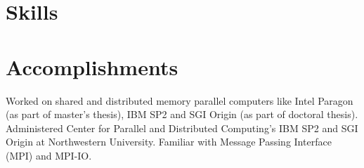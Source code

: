 \documentclass[10pt,a4paper,sans]{moderncv}
\begin{document}
\makecvtitle
\section{Skills} 

\section{Accomplishments} 
 {Worked on shared and distributed memory parallel computers like
	Intel Paragon (as part of master's thesis), IBM SP2 and SGI Origin
	(as part of doctoral thesis). Administered Center for Parallel and
	Distributed Computing's  IBM SP2 and SGI Origin at Northwestern
University. Familiar with Message Passing Interface (MPI) and MPI-IO.}
\end{document}

